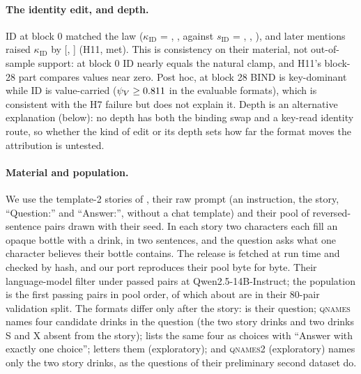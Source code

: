 \paragraph{The identity edit, and depth.}
ID at block 0 matched the law ($\kappa_{\mathrm{ID}}$ = \PkKappaIdZeroNone{}, \PkKappaIdZeroQnames{}, \PkKappaIdZeroOpt{} against $s_{\mathrm{ID}}$ = \HelevenSidNone{}, \HelevenSidQnames{}, \HelevenSidOpt{}), and later mentions raised $\kappa_{\mathrm{ID}}$ by \HelevenDiff{} [\HelevenDiffLo{}, \HelevenDiffHi{}] (H11, met). This is consistency on their material, not out-of-sample support: at block 0 ID nearly equals the natural clamp, and H11's block-28 part compares values near zero. Post hoc, at block 28 BIND is key-dominant while ID is value-carried ($\psi_V \geq 0.811{}$ in the evaluable formats), which is consistent with the H7 failure but does not explain it. Depth is an alternative explanation (below): no depth has both the binding swap and a key-read identity route, so whether the kind of edit or its depth sets how far the format moves the attribution is untested.

\paragraph{Material and population.} We use the template-2 stories of \citet{prakash2025lookbacks}, their raw prompt (an instruction, the story, ``Question:'' and ``Answer:'', without a chat template) and their pool of \PkNpool{} reversed-sentence pairs drawn with their seed. In each story two characters each fill an opaque bottle with a drink, in two sentences, and the question asks what one character believes their bottle contains. The release is fetched at run time and checked by hash, and our port reproduces their pool byte for byte. Their language-model filter under \fmtNone{} passed \PkNpass{} pairs at Qwen2.5-14B-Instruct; the population is the first \PkN{} passing pairs in pool order, of which about \PkOverlap{} are in their 80-pair validation split. The formats differ only after the story: \fmtNone{} is their question; \textsc{qnames} names four candidate drinks in the question (the two story drinks and two drinks S and X absent from the story); \fmtOpt{} lists the same four as choices with ``Answer with exactly one choice''; \fmtLetter{} letters them (exploratory); and \textsc{qnames2} (exploratory) names only the two story drinks, as the questions of their preliminary second dataset do.

